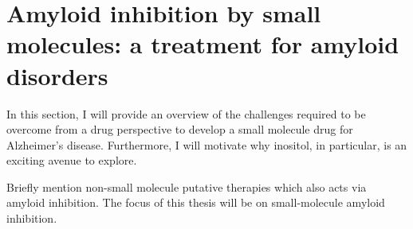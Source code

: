 \section{Amyloid inhibition by small molecules: a treatment for amyloid disorders}
\begin{outline}
	\1 In this section, I will provide an overview of the challenges required to be overcome from a drug perspective to develop a small molecule drug for Alzheimer's disease.  Furthermore, I will motivate why inositol, in particular, is an exciting avenue to explore.
	
	\1 Briefly mention non-small molecule putative therapies which also acts via amyloid inhibition. The focus of this thesis will be on small-molecule amyloid inhibition.
\end{outline}

